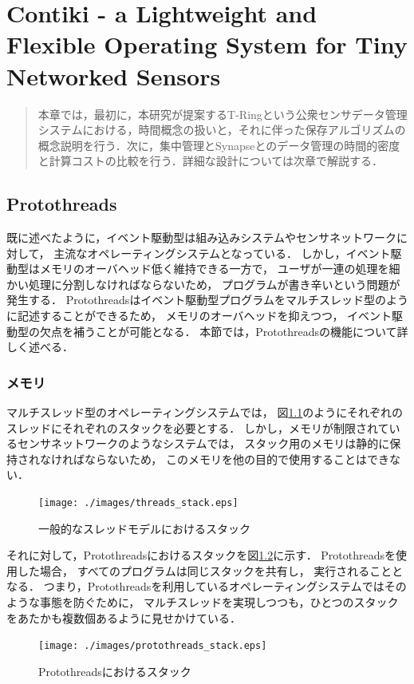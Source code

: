 \chapter{Contiki - a Lightweight and Flexible Operating System for Tiny Networked Sensors}
\begin{large}
\begin{quote}
本章では，最初に，本研究が提案するT-Ringという公衆センサデータ管理システムにおける，時間概念の扱いと，それに伴った保存アルゴリズムの概念説明を行う．次に，集中管理とSynapseとのデータ管理の時間的密度と計算コストの比較を行う．詳細な設計については次章で解説する．

\end{quote}
\end{large}
\clearpage

\section{Protothreads}\label{sec:protothreads}
既に述べたように，イベント駆動型は組み込みシステムやセンサネットワークに対して，
主流なオペレーティングシステムとなっている．
しかし，イベント駆動型はメモリのオーバヘッド低く維持できる一方で，
ユーザが一連の処理を細かい処理に分割しなければならないため，
プログラムが書き辛いという問題が発生する．
Protothreads\cite{Dunkels:2006:PSE:1182807.1182811}はイベント駆動型プログラムをマルチスレッド型のように記述することができるため，
メモリのオーバヘッドを抑えつつ，
イベント駆動型の欠点を補うことが可能となる．
本節では，Protothreadsの機能について詳しく述べる．

\subsection{メモリ}
マルチスレッド型のオペレーティングシステムでは，
図\ref{fig:threads_stack}のようにそれぞれのスレッドにそれぞれのスタックを必要とする．
しかし，メモリが制限されているセンサネットワークのようなシステムでは，
スタック用のメモリは静的に保持されなければならないため，
このメモリを他の目的で使用することはできない．
\begin{figure}[htbp]
 \begin{center}
  \texttt{[image: ./images/threads\_stack.eps]}
 \end{center}
 \caption{一般的なスレッドモデルにおけるスタック}
 \label{fig:threads_stack}
\end{figure}

それに対して，Protothreadsにおけるスタックを図\ref{fig:protothreads_stack}に示す．
Protothreadsを使用した場合，
すべてのプログラムは同じスタックを共有し，
実行されることとなる．
つまり，Protothreadsを利用しているオペレーティングシステムではそのような事態を防ぐために，
マルチスレッドを実現しつつも，ひとつのスタックをあたかも複数個あるように見せかけている．
\begin{figure}[htbp]
 \begin{center}
  \texttt{[image: ./images/protothreads\_stack.eps]}
 \end{center}
 \caption{Protothreadsにおけるスタック}
 \label{fig:protothreads_stack}
\end{figure}



